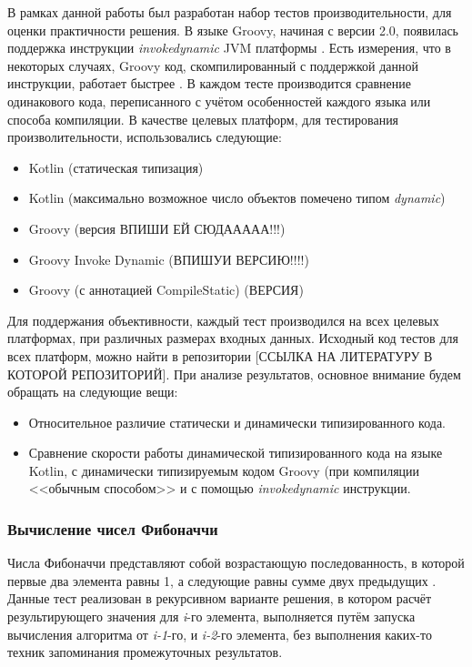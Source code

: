 В рамках данной работы был разработан набор тестов производительности, для оценки практичности решения. В языке Groovy, начиная с версии 2.0, появилась поддержка инструкции \textit{invokedynamic} JVM платформы \cite{groovy:invokeDynamicSupport}. Есть измерения, что в некоторых случаях, Groovy код, скомпилированный с поддержкой данной инструкции, работает быстрее \cite{groovy:indyTest1}.
В каждом тесте производится сравнение одинакового кода, переписанного с учётом особенностей каждого языка или способа компиляции. В качестве целевых платформ, для тестирования произволительности, использовались следующие:

\begin{itemize}
    \item Kotlin (статическая типизация) 
    \item Kotlin (максимально возможное число объектов помечено типом \textit{dynamic})
    \item Groovy (версия ВПИШИ ЕЙ СЮДААААА!!!)
    \item Groovy Invoke Dynamic (ВПИШУИ ВЕРСИЮ!!!!)
    \item Groovy (с аннотацией \at CompileStatic) (ВЕРСИЯ)
\end{itemize}


Для поддержания объективности, каждый тест производился на всех целевых платформах, при различных размерах входных данных. Исходный код тестов для всех платформ, можно найти в репозитории [ССЫЛКА НА ЛИТЕРАТУРУ В КОТОРОЙ РЕПОЗИТОРИЙ]. При анализе результатов, основное внимание будем обращать на следующие вещи:

\begin{itemize}
    \item Относительное различие статически и динамически типизированного кода.
    \item Сравнение скорости работы динамической типизированного кода на языке Kotlin, с динамически типизируемым кодом Groovy (при компиляции <<обычным способом>> и с помощью \textit{invokedynamic} инструкции.
\end{itemize}

\subsubsection{Вычисление чисел Фибоначчи}

Числа Фибоначчи представляют собой возрастающую последованность, в которой первые два элемента равны 1, а следующие равны сумме двух предыдущих \cite{math:vilenkin1969Combinatorics}. Данные тест реализован в рекурсивном варианте решения, в котором расчёт результирующего значения для \textit{i}-го элемента, выполняется путём запуска вычисления алгоритма от \textit{i-1}-го, и \textit{i-2}-го элемента, без выполнения каких-то техник запоминания промежуточных результатов.

